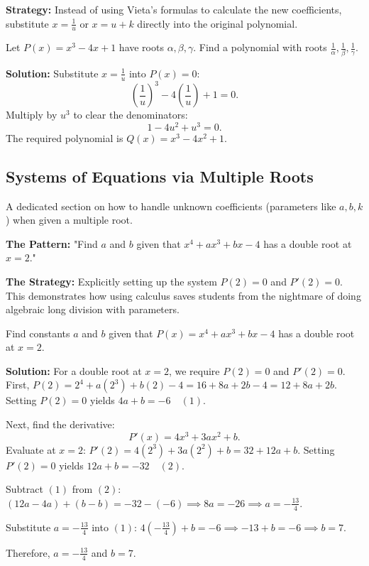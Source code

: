 \documentclass[12pt]{article}
\newenvironment{example}[1][]{%
  \begin{examplebox}[title={\bfseries Example~\thetcbcounter\ifx\relax#1\relax\else\ (#1)\fi}]%
}{%
  \end{examplebox}%
}
\begin{document}
\textbf{Strategy:} Instead of using Vieta's formulas to calculate the new coefficients, substitute $x = \frac{1}{u}$ or $x = u+k$ directly into the original polynomial.

\begin{example}
Let $P(x) = x^3 - 4x + 1$ have roots $\alpha, \beta, \gamma$. Find a polynomial with roots $\frac{1}{\alpha}, \frac{1}{\beta}, \frac{1}{\gamma}$.

\textbf{Solution:} Substitute $x = \frac{1}{u}$ into $P(x) = 0$:
\[
\left(\frac{1}{u}\right)^3 - 4\left(\frac{1}{u}\right) + 1 = 0.
\]
Multiply by $u^3$ to clear the denominators:
\[
1 - 4u^2 + u^3 = 0.
\]
The required polynomial is $Q(x) = x^3 - 4x^2 + 1$.
\end{example}

\subsection{Systems of Equations via Multiple Roots}

A dedicated section on how to handle unknown coefficients (parameters like $a, b, k$) when given a multiple root.

\textbf{The Pattern:} "Find $a$ and $b$ given that $x^4 + ax^3 + bx - 4$ has a double root at $x = 2$."

\textbf{The Strategy:} Explicitly setting up the system $P(2) = 0$ and $P'(2) = 0$. This demonstrates how using calculus saves students from the nightmare of doing algebraic long division with parameters.

\begin{example}
Find constants $a$ and $b$ given that $P(x) = x^4 + ax^3 + bx - 4$ has a double root at $x = 2$.

\textbf{Solution:} For a double root at $x = 2$, we require $P(2) = 0$ and $P'(2) = 0$.
First, $P(2) = 2^4 + a(2^3) + b(2) - 4 = 16 + 8a + 2b - 4 = 12 + 8a + 2b$.
Setting $P(2) = 0$ yields $4a + b = -6 \quad (1)$.

Next, find the derivative:
\[
P'(x) = 4x^3 + 3ax^2 + b.
\]
Evaluate at $x=2$:
$P'(2) = 4(2^3) + 3a(2^2) + b = 32 + 12a + b$.
Setting $P'(2) = 0$ yields $12a + b = -32 \quad (2)$.

Subtract $(1)$ from $(2)$:
$(12a - 4a) + (b - b) = -32 - (-6) \implies 8a = -26 \implies a = -\frac{13}{4}$.

Substitute $a = -\frac{13}{4}$ into $(1)$:
$4(-\frac{13}{4}) + b = -6 \implies -13 + b = -6 \implies b = 7$.

Therefore, $a = -\frac{13}{4}$ and $b = 7$.
\end{example}
\end{document}
